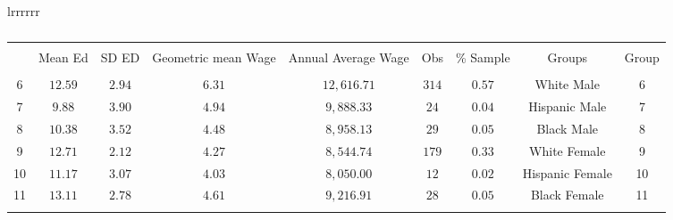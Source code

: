 \begin{table}[htbp]
\begin{tabular}{lrrrrrr}
\begin{table}[!htbp] \centering 
  \caption{} 
  \label{} 
\begin{tabular}{@{\extracolsep{5pt}} ccccccccc} 
\\[-1.8ex]\hline 
\hline \\[-1.8ex] 
 & Mean Ed & SD ED & Geometric mean Wage & Annual Average Wage & Obs & \% Sample & Groups & Group \\ 
\hline \\[-1.8ex] 
6 & $12.59$ & $2.94$ & $6.31$ & $12,616.71$ & $314$ & $0.57$ & White Male & 6 \\ 
7 & $9.88$ & $3.90$ & $4.94$ & $9,888.33$ & $24$ & $0.04$ & Hispanic Male & 7 \\ 
8 & $10.38$ & $3.52$ & $4.48$ & $8,958.13$ & $29$ & $0.05$ & Black Male & 8 \\ 
9 & $12.71$ & $2.12$ & $4.27$ & $8,544.74$ & $179$ & $0.33$ & White Female & 9 \\ 
10 & $11.17$ & $3.07$ & $4.03$ & $8,050.00$ & $12$ & $0.02$ & Hispanic Female & 10 \\ 
11 & $13.11$ & $2.78$ & $4.61$ & $9,216.91$ & $28$ & $0.05$ & Black Female & 11 \\ 
\hline \\[-1.8ex] 
\end{tabular} 
\end{table} 
\bottomrule
\end{tabular}
\end{table}
